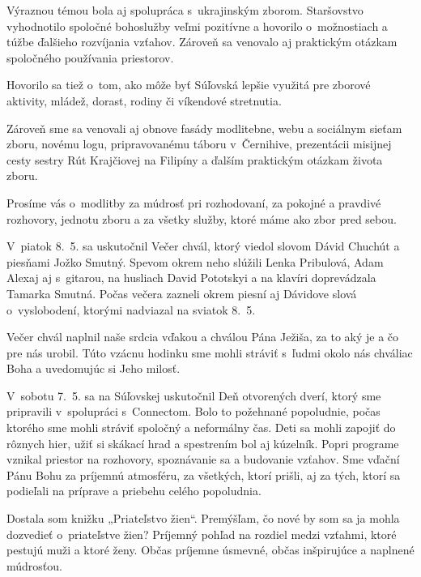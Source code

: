 Výraznou témou bola aj spolupráca s~ukrajinským zborom. Staršovstvo vyhodnotilo spoločné bohoslužby veľmi pozitívne a hovorilo o~možnostiach a túžbe ďalšieho rozvíjania vzťahov. Zároveň sa venovalo aj praktickým otázkam spoločného používania priestorov.

Hovorilo sa tiež o~tom, ako môže byť Súľovská lepšie využitá pre zborové aktivity, mládež, dorast, rodiny či víkendové stretnutia.

Zároveň sme sa venovali aj obnove fasády modlitebne, webu a sociálnym sieťam zboru, novému logu, pripravovanému táboru v~Černihive, prezentácii misijnej cesty sestry Rút Krajčiovej na Filipíny a ďalším praktickým otázkam života zboru.

Prosíme vás o~modlitby za múdrosť pri rozhodovaní, za pokojné a pravdivé rozhovory, jednotu zboru a za všetky služby, ktoré máme ako zbor pred sebou.


V~piatok 8.~5. sa uskutočnil Večer chvál, ktorý viedol slovom Dávid Chuchút a piesňami Jožko Smutný. Spevom okrem neho slúžili Lenka Pribulová, Adam Alexaj aj s~gitarou, na husliach David Pototskyi a na klavíri doprevádzala Tamarka Smutná. Počas večera zazneli okrem piesní aj Dávidove slová o~vyslobodení, ktorými nadviazal na sviatok 8.~5.

Večer chvál naplnil naše srdcia vďakou a chválou Pána Ježiša, za to aký je a čo pre nás urobil. Túto vzácnu hodinku sme mohli stráviť s~ľudmi okolo nás chváliac Boha a uvedomujúc si Jeho milosť.


V~sobotu 7.~5. sa na Súľovskej uskutočnil Deň otvorených dverí, ktorý sme pripravili v~spolupráci s~Connectom. Bolo to požehnané popoludnie, počas ktorého sme mohli stráviť spoločný a neformálny čas.
Deti sa mohli zapojiť do rôznych hier, užiť si skákací hrad a spestrením bol aj kúzelník. Popri programe vznikal priestor na rozhovory, spoznávanie sa a budovanie vzťahov.
Sme vďační Pánu Bohu za príjemnú atmosféru, za všetkých, ktorí prišli, aj za tých, ktorí sa podieľali na príprave a priebehu celého popoludnia.


Dostala som knižku „Priateľstvo žien“. Premýšľam, čo nové by som sa ja mohla dozvedieť o~priateľstve žien? Príjemný pohľad na rozdiel medzi vzťahmi, ktoré pestujú muži a ktoré ženy. Občas príjemne úsmevné, občas inšpirujúce a naplnené múdrosťou.


